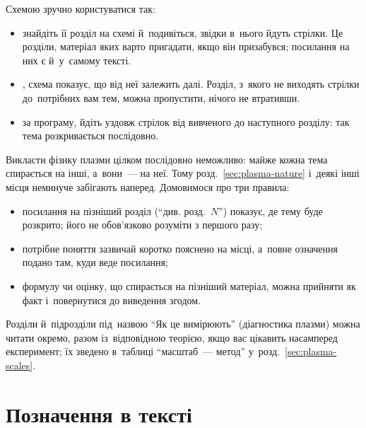 Схемою зручно користуватися так:
\begin{itemize}
	\item {} знайдіть її розділ на схемі й~подивіться, звідки в~нього йдуть стрілки.
	      Це розділи, матеріал яких варто пригадати, якщо він призабувся; посилання на них є й~у~самому тексті.
	\item {}, схема показує, що від неї залежить далі. Розділ,
	      з~якого не виходять стрілки до~потрібних вам тем, можна пропустити, нічого не втративши.
	\item {} за програму, йдіть уздовж стрілок від вивченого до наступного
	      розділу: так тема розкривається послідовно.
\end{itemize}
 Викласти фізику плазми цілком послідовно неможливо: майже кожна тема спирається на інші, а~вони~--- на неї.
Тому розд.~\ref{sec:plasma-nature} і~деякі інші місця неминуче забігають наперед. Домовимося про три правила:
\begin{itemize}
	\item посилання на пізніший розділ (\enquote{див. розд.~$N$}) показує, де тему буде розкрито; його не обов'язково розуміти з першого разу;
	\item потрібне поняття зазвичай коротко пояснено на місці, а~повне означення подано там, куди веде посилання;
	\item формулу чи оцінку, що спирається на пізніший матеріал, можна прийняти як факт і~повернутися до виведення згодом.
\end{itemize}
Розділи й~підрозділи під~назвою \enquote{Як це вимірюють} (діагностика плазми) можна читати окремо,
разом із~відповідною теорією, якщо вас цікавить насамперед експеримент; їх зведено в~таблиці
\enquote{масштаб~--- метод} у~розд.~\ref{sec:plasma-scales}.

\section*{Позначення в тексті}

